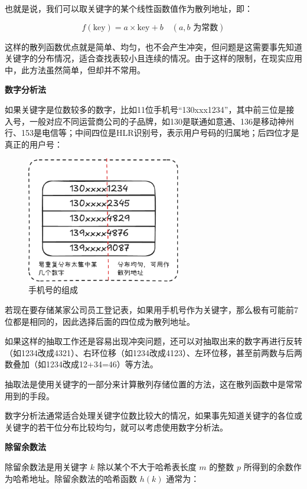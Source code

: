 \documentclass[lang=cn,newtx,10pt,scheme=chinese]{elegantbook}
\begin{document}
也就是说，我们可以取关键字的某个线性函数值作为散列地址，即：

\[
f(\text{key}) = a \times \text{key} + b \quad (a, b \text{ 为常数})
\]

这样的散列函数优点就是简单、均匀，也不会产生冲突，但问题是这需要事先知道关键字的分布情况，适合查找表较小且连续的情况。由于这样的限制，在现实应用中，此方法虽然简单，但却并不常用。

\textbf{数字分析法}

如果关键字是位数较多的数字，比如11位手机号“130xxx1234”，其中前三位是接入号，一般对应不同运营商公司的子品牌，如130是联通如意通、136是移动神州行、153是电信等；中间四位是HLR识别号，表示用户号码的归属地；后四位才是真正的用户号：

\begin{figure}[h!]
  \centering
  \includegraphics[width=0.6\textwidth]{./figure/pdf/cropped/digital_judge.pdf}
  \caption{手机号的组成}
  \label{fig:phoneNumber}
\end{figure}

若现在要存储某家公司员工登记表，如果用手机号作为关键字，那么极有可能前7位都是相同的，因此选择后面的四位成为散列地址。

如果这样的抽取工作还是容易出现冲突问题，还可以对抽取出来的数字再进行反转（如1234改成4321）、右环位移（如1234改成4123）、左环位移，甚至前两数与后两数叠加（如1234改成12+34=46）等方法。

抽取法是使用关键字的一部分来计算散列存储位置的方法，这在散列函数中是常常用到的手段。

数字分析法通常适合处理关键字位数比较大的情况，如果事先知道关键字的各位或关键字的若干位分布比较均匀，就可以考虑使用数字分析法。

\textbf{除留余数法}

除留余数法是用关键字 $k$ 除以某个不大于哈希表长度 $m$ 的整数 $p$ 所得到的余数作为哈希地址。除留余数法的哈希函数 $h(k)$ 通常为：
\end{document}

